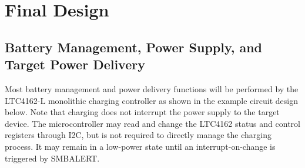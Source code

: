 \documentclass[12pt]{article}
\begin{document}
\section{Final Design }

\subsection{Battery Management, Power Supply, and Target Power Delivery}
\indent \indent
Most battery management and power delivery functions will be performed by the LTC4162-L monolithic charging controller as shown in the example circuit design below. Note that charging does not interrupt the power supply to the target device. The microcontroller may read and change the LTC4162 status and control registers through I2C, but is not required to directly manage the charging process. It may remain in a low-power state until an interrupt-on-change is triggered by SMBALERT.\\
\end{document}
